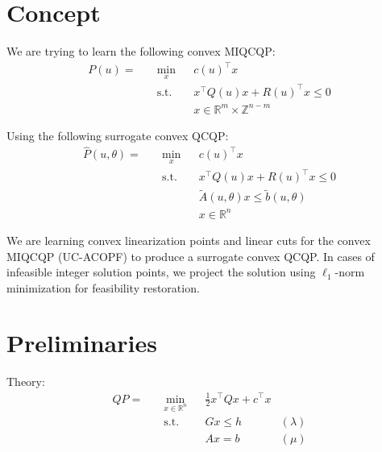 \documentclass[11pt,twoside]{article}
\begin{document}
\section{Concept}

We are trying to learn the following convex MIQCQP:
\begin{equation}
	\begin{aligned}
		P(u) = \quad & \min_{x} & & c(u)^\top x \\
		& \text{s.t.} & & x^\top Q(u) x + R(u)^\top x \leq 0 \\
		&&& x \in \mathbb{R}^m \times \mathbb{Z}^{n-m}	
	\end{aligned}
\end{equation}


Using the following surrogate convex QCQP:
\begin{equation}
	\begin{aligned}
		\hat{P}(u,\theta) = \quad & \min_{x} & & c(u)^\top x \\
		& \text{s.t.} & & x^\top Q(u) x + R(u)^\top x \leq 0 \\
		&&& \tilde{A}(u, \theta) x \leq \tilde{b}(u, \theta) \\
		&&& x \in \mathbb{R}^n
	\end{aligned}
\end{equation}

We are learning convex linearization points and linear cuts for the convex MIQCQP (UC-ACOPF) to produce a surrogate convex QCQP. In cases of infeasible integer solution points, we project the solution using $\ell_1$-norm minimization for feasibility restoration.

\section{Preliminaries}
Theory:
\begin{equation}
	\begin{aligned}
		QP = \quad & \min_{x\in\mathbb{R}^n} & &\frac{1}{2} x^\top Q x + c^\top x \\
		& \text{s.t.} & & Gx \leq h & (\lambda) \\
		&&& Ax = b & (\mu) 
	\end{aligned}
\end{equation}
\end{document}
